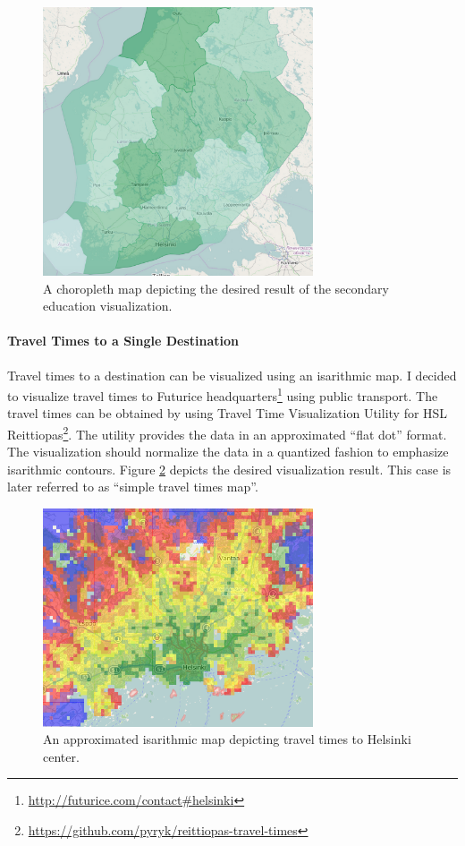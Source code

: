 \begin{figure}[htbp]
  \begin{center}
    \includegraphics[width=8cm]{images/choropleth-d3-example.png}
    \caption{A choropleth map depicting the desired result of the secondary education visualization.}
    \label{fig:secondaryeducationresult}
  \end{center}
\end{figure}

\paragraph{Travel Times to a Single Destination}
Travel times to a destination can be visualized using an isarithmic map. I decided to visualize travel times to Futurice headquarters\footnote{\url{http://futurice.com/contact\#helsinki}} using public transport. The travel times can be obtained by using Travel Time Visualization Utility for HSL Reittiopas\footnote{\url{https://github.com/pyryk/reittiopas-travel-times}}. The utility provides the data in an approximated ``flat dot'' format. The visualization should normalize the data in a quantized fashion to emphasize isarithmic contours. Figure \ref{fig:isarithmicimpl} depicts the desired visualization result. This case is later referred to as ``simple travel times map''.

\begin{figure}[htbp]
  \begin{center}
    \includegraphics[width=8cm]{images/isarithmic-example-thematic.png}
    \caption{An approximated isarithmic map depicting travel times to Helsinki center.}
    \label{fig:isarithmicimpl}
  \end{center}
\end{figure}

